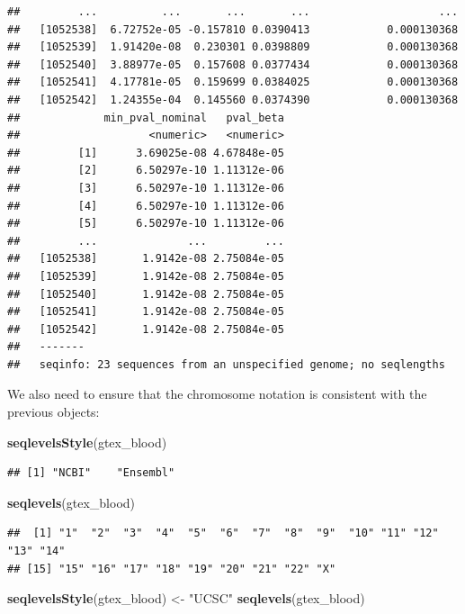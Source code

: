 \documentclass[9pt,a4paper,]{extarticle}
\newenvironment{Shaded}{\begin{snugshade}}{\end{snugshade}}
\newcommand{\KeywordTok}[1]{\textcolor[rgb]{0.13,0.29,0.53}{\textbf{#1}}}
\newcommand{\StringTok}[1]{\textcolor[rgb]{0.31,0.60,0.02}{#1}}
\newcommand{\NormalTok}[1]{#1}
\begin{document}
\begin{verbatim}
##         ...          ...       ...       ...                    ...
##   [1052538]  6.72752e-05 -0.157810 0.0390413            0.000130368
##   [1052539]  1.91420e-08  0.230301 0.0398809            0.000130368
##   [1052540]  3.88977e-05  0.157608 0.0377434            0.000130368
##   [1052541]  4.17781e-05  0.159699 0.0384025            0.000130368
##   [1052542]  1.24355e-04  0.145560 0.0374390            0.000130368
##             min_pval_nominal   pval_beta
##                    <numeric>   <numeric>
##         [1]      3.69025e-08 4.67848e-05
##         [2]      6.50297e-10 1.11312e-06
##         [3]      6.50297e-10 1.11312e-06
##         [4]      6.50297e-10 1.11312e-06
##         [5]      6.50297e-10 1.11312e-06
##         ...              ...         ...
##   [1052538]       1.9142e-08 2.75084e-05
##   [1052539]       1.9142e-08 2.75084e-05
##   [1052540]       1.9142e-08 2.75084e-05
##   [1052541]       1.9142e-08 2.75084e-05
##   [1052542]       1.9142e-08 2.75084e-05
##   -------
##   seqinfo: 23 sequences from an unspecified genome; no seqlengths
\end{verbatim}

We also need to ensure that the chromosome notation is consistent with the previous objects:

\begin{Shaded}
\begin{Highlighting}[]
\KeywordTok{seqlevelsStyle}\NormalTok{(gtex_blood)}
\end{Highlighting}
\end{Shaded}

\begin{verbatim}
## [1] "NCBI"    "Ensembl"
\end{verbatim}

\begin{Shaded}
\begin{Highlighting}[]
\KeywordTok{seqlevels}\NormalTok{(gtex_blood)}
\end{Highlighting}
\end{Shaded}

\begin{verbatim}
##  [1] "1"  "2"  "3"  "4"  "5"  "6"  "7"  "8"  "9"  "10" "11" "12" "13" "14"
## [15] "15" "16" "17" "18" "19" "20" "21" "22" "X"
\end{verbatim}

\begin{Shaded}
\begin{Highlighting}[]
\KeywordTok{seqlevelsStyle}\NormalTok{(gtex_blood) <-}\StringTok{ "UCSC"}
\KeywordTok{seqlevels}\NormalTok{(gtex_blood)}
\end{Highlighting}
\end{Shaded}
\end{document}
